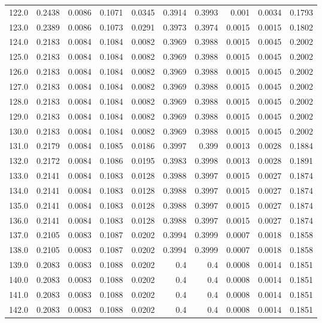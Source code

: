 \begin{longtable}{lrrrrrrrrr}
122.0 & 0.2438 & 0.0086 & 0.1071 & 0.0345 & 0.3914 & 0.3993 & 0.001 & 0.0034 & 0.1793 \\
123.0 & 0.2389 & 0.0086 & 0.1073 & 0.0291 & 0.3973 & 0.3974 & 0.0015 & 0.0015 & 0.1802 \\
124.0 & 0.2183 & 0.0084 & 0.1084 & 0.0082 & 0.3969 & 0.3988 & 0.0015 & 0.0045 & 0.2002 \\
125.0 & 0.2183 & 0.0084 & 0.1084 & 0.0082 & 0.3969 & 0.3988 & 0.0015 & 0.0045 & 0.2002 \\
126.0 & 0.2183 & 0.0084 & 0.1084 & 0.0082 & 0.3969 & 0.3988 & 0.0015 & 0.0045 & 0.2002 \\
127.0 & 0.2183 & 0.0084 & 0.1084 & 0.0082 & 0.3969 & 0.3988 & 0.0015 & 0.0045 & 0.2002 \\
128.0 & 0.2183 & 0.0084 & 0.1084 & 0.0082 & 0.3969 & 0.3988 & 0.0015 & 0.0045 & 0.2002 \\
129.0 & 0.2183 & 0.0084 & 0.1084 & 0.0082 & 0.3969 & 0.3988 & 0.0015 & 0.0045 & 0.2002 \\
130.0 & 0.2183 & 0.0084 & 0.1084 & 0.0082 & 0.3969 & 0.3988 & 0.0015 & 0.0045 & 0.2002 \\
131.0 & 0.2179 & 0.0084 & 0.1085 & 0.0186 & 0.3997 & 0.399 & 0.0013 & 0.0028 & 0.1884 \\
132.0 & 0.2172 & 0.0084 & 0.1086 & 0.0195 & 0.3983 & 0.3998 & 0.0013 & 0.0028 & 0.1891 \\
133.0 & 0.2141 & 0.0084 & 0.1083 & 0.0128 & 0.3988 & 0.3997 & 0.0015 & 0.0027 & 0.1874 \\
134.0 & 0.2141 & 0.0084 & 0.1083 & 0.0128 & 0.3988 & 0.3997 & 0.0015 & 0.0027 & 0.1874 \\
135.0 & 0.2141 & 0.0084 & 0.1083 & 0.0128 & 0.3988 & 0.3997 & 0.0015 & 0.0027 & 0.1874 \\
136.0 & 0.2141 & 0.0084 & 0.1083 & 0.0128 & 0.3988 & 0.3997 & 0.0015 & 0.0027 & 0.1874 \\
137.0 & 0.2105 & 0.0083 & 0.1087 & 0.0202 & 0.3994 & 0.3999 & 0.0007 & 0.0018 & 0.1858 \\
138.0 & 0.2105 & 0.0083 & 0.1087 & 0.0202 & 0.3994 & 0.3999 & 0.0007 & 0.0018 & 0.1858 \\
139.0 & 0.2083 & 0.0083 & 0.1088 & 0.0202 & 0.4 & 0.4 & 0.0008 & 0.0014 & 0.1851 \\
140.0 & 0.2083 & 0.0083 & 0.1088 & 0.0202 & 0.4 & 0.4 & 0.0008 & 0.0014 & 0.1851 \\
141.0 & 0.2083 & 0.0083 & 0.1088 & 0.0202 & 0.4 & 0.4 & 0.0008 & 0.0014 & 0.1851 \\
142.0 & 0.2083 & 0.0083 & 0.1088 & 0.0202 & 0.4 & 0.4 & 0.0008 & 0.0014 & 0.1851 \\

\end{longtable}
